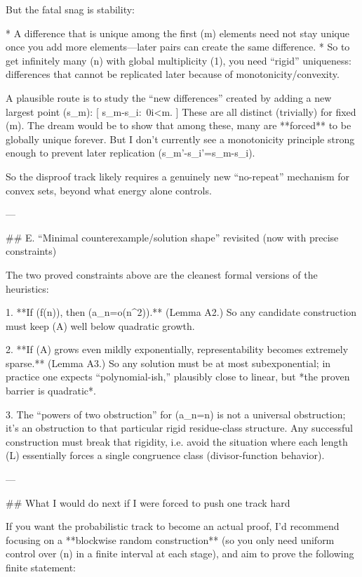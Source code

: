 But the fatal snag is stability:

* A difference that is unique among the first (m) elements need not stay unique once you add more elements—later pairs can create the same difference.
* So to get infinitely many (n) with global multiplicity (1), you need “rigid” uniqueness: differences that cannot be replicated later because of monotonicity/convexity.

A plausible route is to study the “new differences” created by adding a new largest point (s_m):
[
{s_m-s_i:\ 0\le i<m}.
]
These are all distinct (trivially) for fixed (m). The dream would be to show that among these, many are **forced** to be globally unique forever. But I don’t currently see a monotonicity principle strong enough to prevent later replication (s_{m'}-s_{i'}=s_m-s_i).

So the disproof track likely requires a genuinely new “no-repeat” mechanism for convex sets, beyond what energy alone controls.

---

## E. “Minimal counterexample/solution shape” revisited (now with precise constraints)

The two proved constraints above are the cleanest formal versions of the heuristics:

1. **If (f(n)\to\infty), then (a_n=o(n^2)).**
   (Lemma A2.)
   So any candidate construction must keep (A) well below quadratic growth.

2. **If (A) grows even mildly exponentially, representability becomes extremely sparse.**
   (Lemma A3.)
   So any solution must be at most subexponential; in practice one expects “polynomial-ish,” plausibly close to linear, but *the proven barrier is quadratic*.

3. The “powers of two obstruction” for (a_n=n) is not a universal obstruction; it’s an obstruction to that particular rigid residue-class structure.
   Any successful construction must break that rigidity, i.e. avoid the situation where each length (L) essentially forces a single congruence class (divisor-function behavior).

---

## What I would do next if I were forced to push one track hard

If you want the probabilistic track to become an actual proof, I’d recommend focusing on a **blockwise random construction** (so you only need uniform control over (n) in a finite interval at each stage), and aim to prove the following finite statement:

